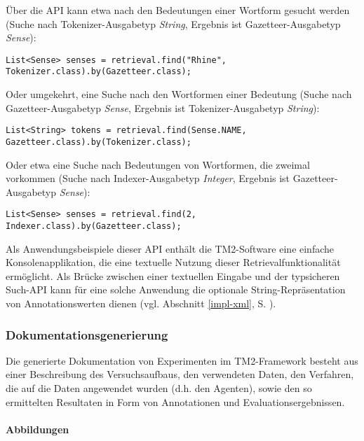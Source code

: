 \documentclass[abstracton, 12pt]{scrartcl}
\begin{document}
Über die API kann etwa nach den Bedeutungen einer Wortform gesucht werden (Suche nach Tokenizer-Aus\-ga\-be\-typ \emph{String}, Ergebnis ist Gazetteer-Aus\-ga\-be\-typ \emph{Sense}):

\begin{lstlisting}
List<Sense> senses = retrieval.find("Rhine", Tokenizer.class).by(Gazetteer.class);
\end{lstlisting}
Oder umgekehrt, eine Suche nach den Wortformen einer Bedeutung (Suche nach Gazetteer-Aus\-ga\-be\-typ \emph{Sense}, Ergebnis ist Tokenizer-Aus\-ga\-be\-typ \emph{String}):

\begin{lstlisting}
List<String> tokens = retrieval.find(Sense.NAME, Gazetteer.class).by(Tokenizer.class);
\end{lstlisting}

Oder etwa eine Suche nach Bedeutungen von Wortformen, die zweimal vorkommen (Suche nach Indexer-Aus\-ga\-be\-typ \emph{Integer}, Ergebnis ist Gazetteer-Aus\-ga\-be\-typ \emph{Sense}):

\begin{lstlisting}
List<Sense> senses = retrieval.find(2, Indexer.class).by(Gazetteer.class);
\end{lstlisting}

Als Anwendungsbeispiele dieser API enthält die TM2-Software eine einfache Konsolenapplikation, die eine textuelle Nutzung dieser Retrievalfunktionalität ermöglicht. Als Brücke zwischen einer textuellen Eingabe und der typsicheren Such-API kann für eine solche Anwendung die optionale String-Repräsentation von Annotationswerten dienen (vgl. Abschnitt \ref{impl-xml}, S. \pageref{impl-xml}).

\subsubsection{Dokumentationsgenerierung} \label{api-doc}

Die generierte Dokumentation von Experimenten im TM2-Framework besteht aus einer Beschreibung des Versuchsaufbaus, den verwendeten Daten, den Verfahren, die auf die Daten angewendet wurden (d.h. den Agenten), sowie den so ermittelten Resultaten in Form von Annotationen und Evaluationsergebnissen.

\paragraph{Abbildungen}
\end{document}
